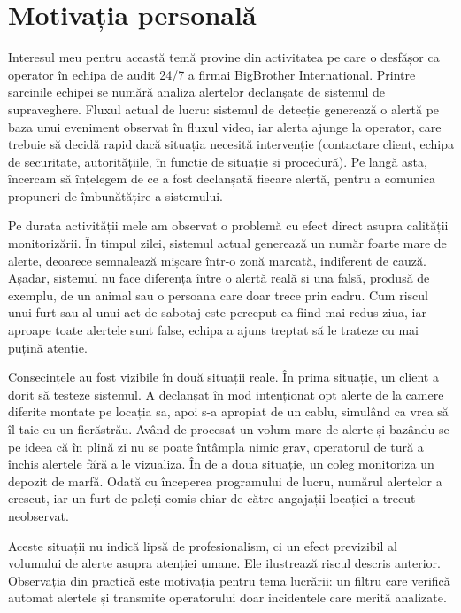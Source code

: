 \section{Motivația personală}

Interesul meu pentru această temă provine din activitatea pe care o 
desfășor ca operator în echipa de audit 24/7 a firmai BigBrother International.
Printre sarcinile echipei se numără analiza alertelor declanșate
de sistemul de supraveghere. Fluxul actual de lucru: sistemul de detecție
generează o alertă pe baza unui eveniment observat în fluxul video, iar
alerta ajunge la operator, care trebuie să decidă rapid dacă situația
necesită intervenție (contactare client, echipa de securitate, 
autoritățiile, în funcție de situație si procedură).
Pe langă asta, încercam să înțelegem de ce a fost declanșată fiecare 
alertă, pentru a comunica propuneri de îmbunătățire a sistemului.

Pe durata activității mele am observat o problemă cu efect direct
asupra calității monitorizării. În timpul zilei, sistemul actual
generează un număr foarte mare de alerte, deoarece semnalează
mișcare într-o zonă marcată, indiferent de cauză. Așadar, sistemul nu face
diferența între o alertă reală si una falsă, produsă de exemplu, de 
un animal sau o persoana care doar trece prin cadru.
Cum riscul unui furt sau al unui act de
sabotaj este perceput ca fiind mai redus ziua, iar aproape toate alertele
sunt false, echipa a ajuns treptat să le trateze cu mai puțină atenție. 


Consecințele au fost vizibile în două situații reale.
În prima situație, 
un client a dorit să testeze sistemul. A declanșat în mod
intenționat opt alerte de la camere diferite montate pe locația
sa, apoi s-a apropiat de un cablu, simulând ca vrea să îl taie
cu un fierăstrău. Având de procesat un volum mare de alerte 
și bazându-se pe ideea că în plină zi nu se poate întâmpla nimic
grav, operatorul de tură a închis alertele fără a le vizualiza.
În de a doua situație, un coleg monitoriza un depozit de marfă. 
Odată cu începerea programului de lucru, numărul alertelor a
crescut, iar un furt de paleți comis chiar de către angajații 
locației a trecut neobservat.

Aceste situații nu indică lipsă de profesionalism, ci un efect
previzibil al volumului de alerte asupra atenției umane.
Ele ilustrează riscul descris anterior. Observația din practică
este motivația pentru tema lucrării: un filtru care verifică automat
alertele și transmite operatorului doar incidentele care merită analizate.

